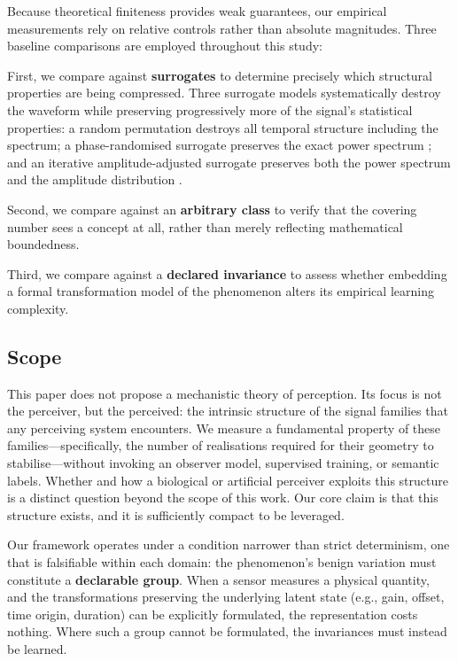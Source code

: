 \documentclass[10pt]{article}
\theoremstyle{plain}
\theoremstyle{definition}
\theoremstyle{remark}
\begin{document}
Because theoretical finiteness provides weak guarantees, our empirical measurements
rely on relative controls rather than absolute magnitudes. Three baseline
comparisons are employed throughout this study:

First, we compare against \textbf{surrogates} to determine precisely which
structural properties are being compressed. Three surrogate models systematically
destroy the waveform while preserving progressively more of the signal's
statistical properties: a random permutation destroys all temporal structure
including the spectrum; a phase-randomised surrogate preserves the exact power
spectrum \citep{theiler1992surrogate}; and an iterative amplitude-adjusted
surrogate preserves both the power spectrum and the amplitude distribution
\citep{schreiber1996improved}.

Second, we compare against an \textbf{arbitrary class} to verify that the
covering number sees a concept at all, rather than
merely reflecting mathematical boundedness.

Third, we compare against a \textbf{declared invariance} to assess whether
embedding a formal transformation model of the phenomenon alters its empirical
learning complexity.

\subsection{Scope}
\label{sec:scope}

This paper does not propose a mechanistic theory of perception. Its focus is not
the perceiver, but the perceived: the intrinsic structure of the signal families
that any perceiving system encounters. We measure a fundamental property of these
families---specifically, the number of realisations required for their geometry to
stabilise---without invoking an observer model, supervised training, or semantic
labels. Whether and how a biological or artificial perceiver exploits this
structure is a distinct question beyond the scope of this work. Our core claim is
that this structure exists, and it is sufficiently compact to be leveraged.

Our framework operates under a condition narrower than strict determinism, one
that is falsifiable within each domain: the phenomenon's benign variation must
constitute a \textbf{declarable group}. When a sensor measures a physical quantity,
and the transformations preserving the underlying latent state (e.g., gain, offset,
    time origin, duration) can be explicitly formulated, the representation costs nothing.
    Where such a group cannot be formulated, the invariances must instead
    be learned.
\end{document}
